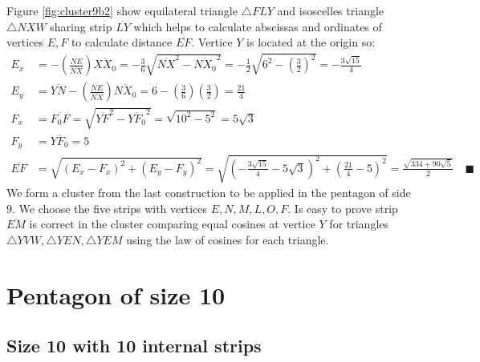 \documentclass[11pt]{article}
\begin{document}
Figure \ref{fig:cluster9b2} show equilateral triangle $\triangle{FLY}$ and isoscelles triangle $\triangle{NXW}$ sharing strip $\overline{LY}$ which helps to calculate abscissas and ordinates of vertices $E,F$ to calculate distance $\overline{EF}$. Vertice $Y$ is located at the origin so:
\begin{align}
E_x &= - \left(\frac{\overline{NE}}{\overline{NX}}\right)\overline{XX_0}
 = -\frac{3}6\sqrt{\overline{NX}^2 - \overline{NX_0}^2}
 = -\frac{1}{2}\sqrt{6^2 - \left(\frac{3}2\right)^2} = -\frac{3\sqrt{15}}4 \\
E_y &= \overline{YN} - \left(\frac{\overline{NE}}{\overline{NX}}\right)\overline{NX_0}
 = 6 - \left(\frac{3}6\right)\left(\frac{3}2\right) = \frac{21}4\\
F_x &= \overline{F_0F} = \sqrt{\overline{YF}^2 - \overline{YF_0}^2}
 = \sqrt{10^2 - 5^2} = 5\sqrt3\\
F_y &= \overline{YF_0} = 5\\
\overline{EF} &= \sqrt{(E_x - F_x)^2 + (E_y - F_y)^2}
 = \sqrt{\left(-\frac{3\sqrt{15}}{4} -5\sqrt3 \right)^2 + \left(\frac{21}4 - 5\right)^2}
 = \frac{\sqrt{334+90\sqrt5}}2 \quad\blacksquare
\end{align}
We form a cluster from the last construction to be applied in the pentagon of side $9$. We choose the five strips with vertices $E,N,M,L,O,F$. Is easy to prove strip $\overline{EM}$ is correct in the cluster comparing equal cosines at vertice $Y$ for triangles $\triangle{YVW},\triangle{YEN},\triangle{YEM}$ using the law of cosines for each triangle.



\section{Pentagon of size 10}

\subsection{Size 10 with 10 internal strips}
\end{document}
